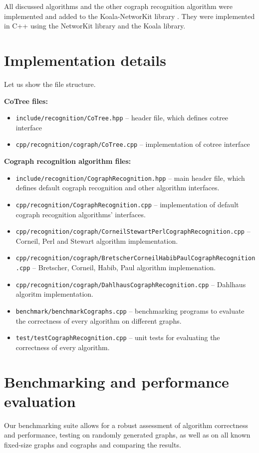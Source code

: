 All discussed algorithms and the other cograph recognition algorithm \cite{Habib2005ASL} were implemented and added to the Koala-NetworKit library \cite{Tur+23}. They were implemented in C++ using the NetworKit \cite{NKT+23} library and
the Koala \cite{Tur+23} library. 

\section{Implementation details}
Let us show the file structure. 

\textbf{CoTree files:}
\begin{itemize}
    \item \texttt{include/recognition/CoTree.hpp} -- header file, which defines cotree interface
    \item \texttt{cpp/recognition/cograph/CoTree.cpp} -- implementation of cotree interface
\end{itemize}
\textbf{Cograph recognition algorithm files:}
\begin{itemize}
    \item \texttt{include/recognition/CographRecognition.hpp} -- main header file, which defines default cograph recognition and other algorithm interfaces.
    \item \texttt{cpp/recognition/CographRecognition.cpp} -- implementation of default cograph recognition algorithms' interfaces.
    \item \texttt{cpp/recognition/cograph/CorneilStewartPerlCographRecognition.cpp} -- Corneil, Perl and Stewart algorithm implementation.
\item \texttt{cpp/recognition/cograph/BretscherCorneilHabibPaulCographRecognition.cpp} -- Bretscher, Corneil, Habib, Paul algorithm implemenation.
\item \texttt{cpp/recognition/cograph/DahlhausCographRecognition.cpp} -- Dahlhaus algoritm implementation.
\item \texttt{benchmark/benchmarkCographs.cpp} -- benchmarking programs to evaluate the correctness of every algorithm on different graphs.
\item \texttt{test/testCographRecognition.cpp} -- unit tests for evaluating the correctness of every algorithm.
\end{itemize}


\section{Benchmarking and performance evaluation}
Our benchmarking suite allows for a robust assessment of algorithm correctness and performance, testing on randomly generated graphs, as well as on all known fixed-size graphs and cographs and comparing the results.

